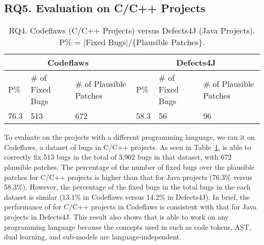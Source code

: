 \subsection{\bf RQ5. Evaluation on C/C++ Projects}
\label{sec:eval-c}

\begin{table}[t]
	\caption{RQ4. Codeflaws (C/C++ Projects) versus Defects4J (Java Projects). P\% = $|$Fixed Bugs$|$/\{Plausible Patches\}.}
	\vspace{-5pt}
	{\footnotesize
		\begin{center}
			\tabcolsep 2.7pt
			\begin{tabular}{p{0.5cm}<{\centering}|p{1.5cm}<{\centering}|p{1.55cm}<{\centering}|p{0.5cm}<{\centering}|p{1.5cm}<{\centering}|p{1.55cm}<{\centering}}\hline	
				
				\multicolumn{3}{c|}{Codeflaws } & \multicolumn{3}{c}{Defects4J}\\\hline
				 P\%& \# of Fixed Bugs& \# of Plausible Patches &P\%& \# of Fixed Bugs & \# of Plausible Patches \\ \hline
				
				  76.3  &        513       &            672             &  58.3 &          56        &        96                 \\
				\hline

			\end{tabular}
			\label{RQ5}
		\end{center}
	}
\end{table}
  
To evaluate {\tool} on the projects with a different programming
language, we ran it on Codeflaws, a dataset of bugs in C/C++ projects.
As seen in Table~\ref{RQ5}, {\tool} is able to correctly fix 513 bugs
in the total of 3,902 bugs in that dataset, with 672 plausible
patches. The percentage of the number of fixed bugs over the plausible
patches for C/C++ projects is higher than that for Java projects
(76.3\% versus 58.3\%). However, the percentage of the fixed bugs in
the total bugs in the each dataset is similar (13.1\% in Codeflaws
versus 14.2\% in Defects4J). In brief, the performance of {\tool} for
C/C++ projects in Codeflaws is consistent with that for Java projects
in Defects4J. This result also shows that {\tool} is able to work on
any programming language because the concepts used in {\tool} such as
code tokens, AST, dual learning, and sub-models are
language-independent.






